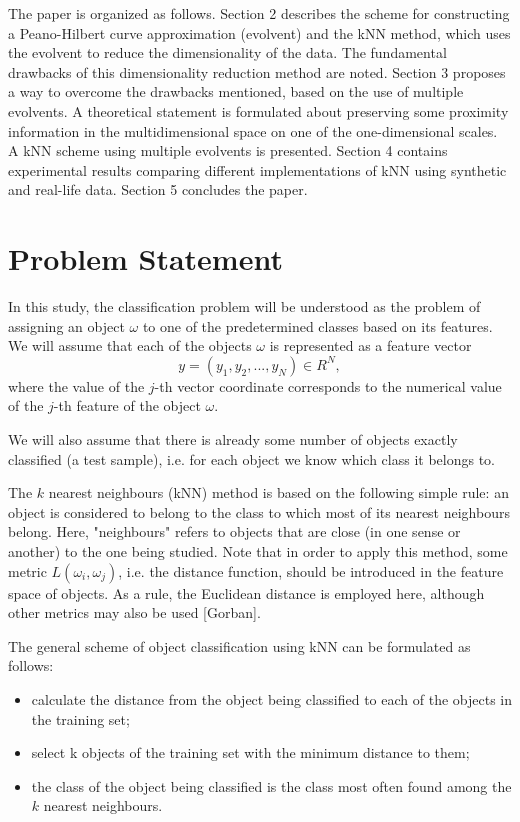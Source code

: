\documentclass[sensors,article,submit,moreauthors,pdftex]{Definitions/mdpi}
\begin{document}
The paper is organized as follows. Section 2 describes the scheme for constructing a Peano-Hilbert curve approximation (evolvent) and the kNN method, which uses the evolvent to reduce the dimensionality of the data. The fundamental drawbacks of this dimensionality reduction method are noted. Section 3 proposes a way to overcome the drawbacks mentioned, based on the use of multiple evolvents. A theoretical statement is formulated about preserving some proximity information in the multidimensional space on one of the one-dimensional scales. A kNN scheme using multiple evolvents is presented. Section 4 contains experimental results comparing different implementations of kNN using synthetic and real-life data. Section 5 concludes the paper.


\section{Problem Statement}

In this study, the classification problem will be understood as the problem of assigning an object $\omega$  to one of the predetermined classes based on its features. We will assume that each of the objects $\omega$ is represented as a feature vector 
\begin{equation}
y = (y_1, y_2, ..., y_N) \in R^N,
\end{equation} 
where the value of the $j$-th vector coordinate corresponds to the numerical value of the $j$-th feature of the object $\omega$.

We will also assume that there is already some number of objects exactly classified (a test sample), i.e. for each object we know which class it belongs to.

The $k$ nearest neighbours (kNN) method is based on the following simple rule: an object is considered to belong to the class to which most of its nearest neighbours belong. Here, "neighbours" refers to objects that are close (in one sense or another) to the one being studied.
Note that in order to apply this method, some metric $L(\omega_i, \omega_j)$, i.e. the distance function, should be introduced in the feature space of objects. As a rule, the Euclidean distance is employed here, although other metrics may also be used [Gorban].

The general scheme of object classification using kNN can be formulated as follows:
\begin{itemize}
\item calculate the distance from the object being classified to each of the objects in the training set;
\item select k objects of the training set with the minimum distance to them;
\item the class of the object being classified is the class most often found among the $k$ nearest neighbours.
\end{itemize}
\end{document}
